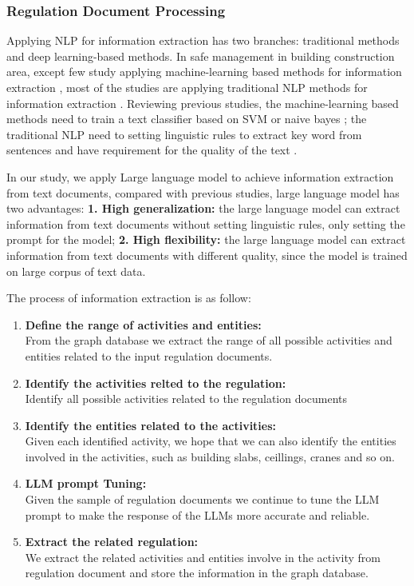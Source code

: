\subsubsection*{Regulation Document Processing} 
Applying NLP for information extraction has two branches: traditional methods and deep learning-based methods.
In safe management in building construction area, 
except few study applying machine-learning based methods for information extraction \cite[]{marucci2017classifying},
most of the studies are applying traditional NLP methods for information extraction \cite[]{xu2021extracting,wu2024nlp}. 
Reviewing previous studies, the machine-learning based methods need to train a text classifier based on SVM or naive bayes \cite[]{marucci2017classifying};
the traditional NLP need to setting linguistic rules to extract key word from sentences and have requirement for the quality of the text \cite[]{xu2021extracting,wu2024nlp}.

In our study, we apply Large language model to achieve information extraction from text documents, compared with previous studies,
large language model has two advantages: \textbf{1. High generalization:} 
the large language model can extract information from text documents without setting linguistic rules, only setting the prompt for the model;
\textbf{2. High flexibility:} the large language model can extract information from text documents with different quality, since the model is trained on large corpus of text data.

The process of information extraction is as follow:
\begin{enumerate}
    \item \textbf{Define the range of activities and entities: } \\
    From the graph database we extract the range of all possible activities and entities related to the input regulation documents. 
    \item \textbf{Identify the activities relted to the regulation: } \\
    Identify all possible activities related to the regulation documents
    \item \textbf{Identify the entities related to the activities: } \\
    Given each identified activity, we hope that we can also identify the entities involved in the activities, such as 
    building slabs, ceillings, cranes and so on.
    \item \textbf{LLM prompt Tuning: } \\
    Given the sample of regulation documents we continue to tune the LLM prompt to make the response of the LLMs more accurate and reliable.
    \item \textbf{Extract the related regulation: } \\
    We extract the related activities and entities involve in the activity from regulation document and store the information in the graph database.
\end{enumerate}


